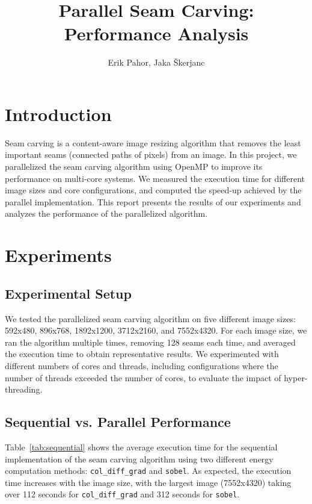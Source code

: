 \documentclass[9pt]{IEEEtran}
\title{\vspace{0ex}
Parallel Seam Carving: Performance Analysis}
\author{Erik Pahor, Jaka Škerjanc\vspace{-4.0ex}}
\begin{document}
\maketitle

\section{Introduction}

Seam carving is a content-aware image resizing algorithm that removes the least important seams (connected paths of pixels) from an image. In this project, we parallelized the seam carving algorithm using OpenMP to improve its performance on multi-core systems. We measured the execution time for different image sizes and core configurations, and computed the speed-up achieved by the parallel implementation. This report presents the results of our experiments and analyzes the performance of the parallelized algorithm.

\section{Experiments}

\subsection{Experimental Setup}
We tested the parallelized seam carving algorithm on five different image sizes: 592x480, 896x768, 1892x1200, 3712x2160, and 7552x4320. For each image size, we ran the algorithm multiple times, removing 128 seams each time, and averaged the execution time to obtain representative results. We experimented with different numbers of cores and threads, including configurations where the number of threads exceeded the number of cores, to evaluate the impact of hyper-threading.

\subsection{Sequential vs. Parallel Performance}
Table~\ref{tab:sequential} shows the average execution time for the sequential implementation of the seam carving algorithm using two different energy computation methods: \texttt{col\_diff\_grad} and \texttt{sobel}. As expected, the execution time increases with the image size, with the largest image (7552x4320) taking over 112 seconds for \texttt{col\_diff\_grad} and 312 seconds for \texttt{sobel}.
\end{document}
